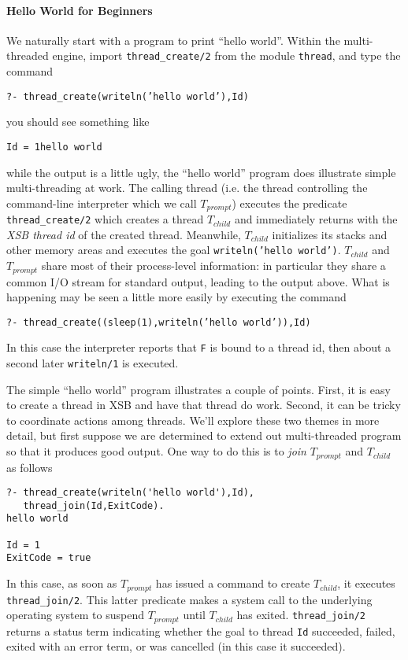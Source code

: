 \paragraph{Hello World for Beginners}
%
We naturally start with a program to print ``hello world''.  Within
the multi-threaded engine, import {\tt thread\_create/2} from the
module {\tt thread}, and type the command
\begin{center} 
{\tt ?- thread\_create(writeln('hello world'),Id)} 
\end{center} 
you should see something like 
\begin{center} 
{\tt Id = 1hello world} 
\end{center} 
%
while the output is a little ugly, the ``hello world'' program does
illustrate simple multi-threading at work.  The calling thread
(i.e. the thread controlling the command-line interpreter which we
call $T_{prompt}$) executes the predicate {\tt thread\_create/2} which
creates a thread $T_{child}$ and immediately returns with the {\em XSB
  thread id} of the created thread.  Meanwhile, $T_{child}$
initializes its stacks and other memory areas and executes the goal
{\tt writeln('hello world')}.  $T_{child}$ and $T_{prompt}$ share most
of their process-level information: in particular they share a common
I/O stream for standard output, leading to the output above.  What is
happening may be seen a little more easily by executing the command
%
\begin{center} 
{\tt ?- thread\_create((sleep(1),writeln('hello world')),Id)} 
\end{center} 
%
In this case the interpreter reports that {\tt F} is bound to a thread
id, then about a second later {\tt writeln/1} is executed.  

The simple ``hello world'' program illustrates a couple of points.
First, it is easy to create a thread in XSB and have that thread do
work.  Second, it can be tricky to coordinate actions among threads.
We'll explore these two themes in more detail, but first suppose we
are determined to extend out multi-threaded program so that it
produces good output.  One way to do this is to {\em join}
$T_{prompt}$ and $T_{child}$ as follows 
%
\begin{verbatim}
?- thread_create(writeln('hello world'),Id),
   thread_join(Id,ExitCode).
hello world

Id = 1
ExitCode = true
\end{verbatim}
%
In this case, as soon as $T_{prompt}$ has issued a command to create
$T_{child}$, it executes {\tt thread\_join/2}.  This latter predicate
makes a system call to the underlying operating system to suspend
$T_{prompt}$ until $T_{child}$ has exited.  {\tt thread\_join/2}
returns a status term indicating whether the goal to thread {\tt Id}
succeeded, failed, exited with an error term, or was cancelled (in
this case it succeeded).

